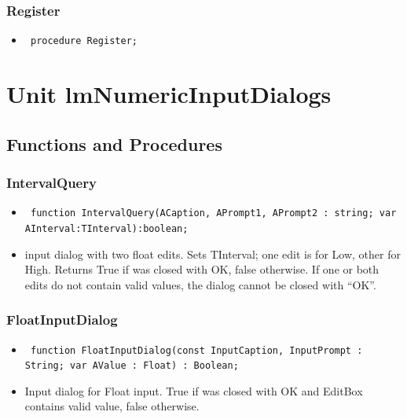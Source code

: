 \documentclass[12pt,a4paper,oneside]{report}
\newcommand{\declarationitem}[1]{{\addfontfeatures{FakeSlant} #1}}
\newcommand{\descriptiontitle}[1]{{\addfontfeatures{FakeSlant}#1}}
\newcommand{\code}[1]{\texttt{#1}}
\begin{document}
\subsection{Register}
\label{lmnumericedits-Register}
\begin{itemize}\item[\declarationitem{Declaration}\hfill]
\begin{flushleft}
\code{
procedure Register;}

\end{flushleft}

\end{itemize}
\chapter{Unit lmNumericInputDialogs}
\label{lmnumericinputdialogs}
\section{Functions and Procedures}
\subsection{IntervalQuery}
\label{lmnumericinputdialogs-IntervalQuery}
\begin{itemize}\item[\declarationitem{Declaration}\hfill]
\begin{flushleft}
\code{
function IntervalQuery(ACaption, APrompt1, APrompt2 : string; var AInterval:TInterval):boolean;}

\end{flushleft}

\par
\item[\descriptiontitle{Description}]
input dialog with two float edits. Sets TInterval; one edit is for Low, other for High. Returns True if was closed with OK, false otherwise. If one or both edits do not contain valid values, the dialog cannot be closed with ``OK''.

\end{itemize}
\subsection{FloatInputDialog}
\label{lmnumericinputdialogs-FloatInputDialog}
\begin{itemize}\item[\declarationitem{Declaration}\hfill]
\begin{flushleft}
\code{
function FloatInputDialog(const InputCaption, InputPrompt : String; var AValue : Float) : Boolean;}
\end{flushleft}
\item[\descriptiontitle{Description}]
Input dialog for Float input. True if was closed with OK and EditBox contains valid value, false otherwise. 
\end{itemize}
\end{document}
